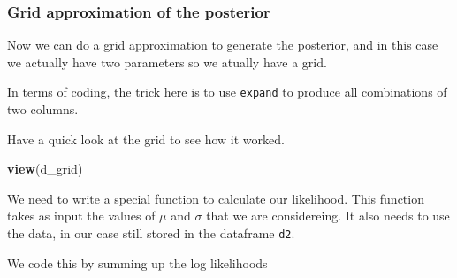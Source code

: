 \documentclass[]{article}
\newenvironment{Shaded}{\begin{snugshade}}{\end{snugshade}}
\newcommand{\CommentTok}[1]{\textcolor[rgb]{0.56,0.35,0.01}{\textit{#1}}}
\newcommand{\ControlFlowTok}[1]{\textcolor[rgb]{0.13,0.29,0.53}{\textbf{#1}}}
\newcommand{\DataTypeTok}[1]{\textcolor[rgb]{0.13,0.29,0.53}{#1}}
\newcommand{\DecValTok}[1]{\textcolor[rgb]{0.00,0.00,0.81}{#1}}
\newcommand{\KeywordTok}[1]{\textcolor[rgb]{0.13,0.29,0.53}{\textbf{#1}}}
\newcommand{\NormalTok}[1]{#1}
\newcommand{\OperatorTok}[1]{\textcolor[rgb]{0.81,0.36,0.00}{\textbf{#1}}}
\newcommand{\OtherTok}[1]{\textcolor[rgb]{0.56,0.35,0.01}{#1}}
\newcommand{\StringTok}[1]{\textcolor[rgb]{0.31,0.60,0.02}{#1}}
\begin{document}
\hypertarget{grid-approximation-of-the-posterior}{%
\subsubsection{Grid approximation of the
posterior}\label{grid-approximation-of-the-posterior}}

Now we can do a grid approximation to generate the posterior, and in
this case we actually have two parameters so we atually have a grid.

In terms of coding, the trick here is to use \texttt{expand} to produce
all combinations of two columns.

\begin{Shaded}
\end{Shaded}

Have a quick look at the grid to see how it worked.

\begin{Shaded}
\begin{Highlighting}[]
\KeywordTok{view}\NormalTok{(d_grid)}
\end{Highlighting}
\end{Shaded}

We need to write a special function to calculate our likelihood. This
function takes as input the values of \(\mu\) and \(\sigma\) that we are
considereing. It also needs to use the data, in our case still stored in
the dataframe \texttt{d2}.

We code this by summing up the log likelihoods

\begin{Shaded}
\end{Shaded}
\end{document}
